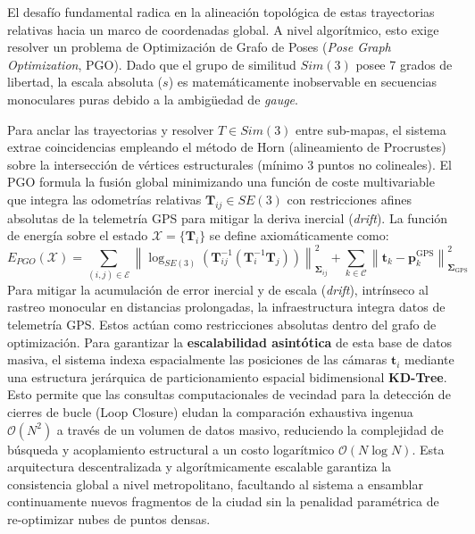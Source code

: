 El desafío fundamental radica en la alineación topológica de estas trayectorias relativas hacia un marco de coordenadas global. A nivel algorítmico, esto exige resolver un problema de Optimización de Grafo de Poses (\textit{Pose Graph Optimization}, PGO). Dado que el grupo de similitud $Sim(3)$ posee 7 grados de libertad, la escala absoluta ($s$) es matemáticamente inobservable en secuencias monoculares puras debido a la ambigüedad de \textit{gauge}. 

Para anclar las trayectorias y resolver $T \in Sim(3)$ entre sub-mapas, el sistema extrae coincidencias empleando el método de Horn (alineamiento de Procrustes) sobre la intersección de vértices estructurales (mínimo 3 puntos no colineales). El PGO formula la fusión global minimizando una función de coste multivariable que integra las odometrías relativas $\mathbf{T}_{ij} \in SE(3)$ con restricciones afines absolutas de la telemetría GPS para mitigar la deriva inercial (\textit{drift}). La función de energía sobre el estado $\mathcal{X} = \{ \mathbf{T}_i \}$ se define axiomáticamente como:
\begin{equation}
    E_{PGO}(\mathcal{X}) = \sum_{(i,j) \in \mathcal{E}} \left\| \log_{SE(3)}\left( \mathbf{T}_{ij}^{-1} (\mathbf{T}_i^{-1} \mathbf{T}_j) \right) \right\|_{\boldsymbol{\Sigma}_{ij}}^2 + \sum_{k \in \mathcal{C}} \left\| \mathbf{t}_k - \mathbf{p}_k^{\text{GPS}} \right\|_{\boldsymbol{\Sigma}_{\text{GPS}}}^2
\end{equation}
Para mitigar la acumulación de error inercial y de escala (\textit{drift}), intrínseco al rastreo monocular en distancias prolongadas, la infraestructura integra datos de telemetría GPS. Estos actúan como restricciones absolutas dentro del grafo de optimización. Para garantizar la \textbf{escalabilidad asintótica} de esta base de datos masiva, el sistema indexa espacialmente las posiciones de las cámaras $\mathbf{t}_i$ mediante una estructura jerárquica de particionamiento espacial bidimensional \textbf{KD-Tree}. Esto permite que las consultas computacionales de vecindad para la detección de cierres de bucle (Loop Closure) eludan la comparación exhaustiva ingenua $\mathcal{O}(N^2)$ a través de un volumen de datos masivo, reduciendo la complejidad de búsqueda y acoplamiento estructural a un costo logarítmico $\mathcal{O}(N \log N)$. Esta arquitectura descentralizada y algorítmicamente escalable garantiza la consistencia global a nivel metropolitano, facultando al sistema a ensamblar continuamente nuevos fragmentos de la ciudad sin la penalidad paramétrica de re-optimizar nubes de puntos densas.

